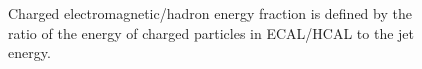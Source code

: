\begin{figure}[hbtp]
  \centering
  \hspace{0.5cm}
  \caption{\label{fig:ChargedEF}Charged electromagnetic/hadron energy fraction is defined by the ratio of the energy of charged particles in ECAL/HCAL to the jet energy.}
\end{figure}

